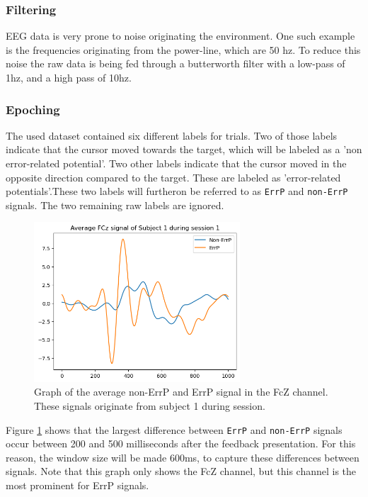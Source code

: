 \subsubsection{Filtering}

EEG data is very prone to noise originating the environment. One such example is the frequencies originating from the power-line, which are 50 hz. To reduce this noise the raw data is being fed through a butterworth filter with a low-pass of 1hz, and a high pass of 10hz.

\subsubsection{Epoching}

The used dataset contained six different labels for trials. Two of those labels indicate that the cursor moved towards the target, which will be labeled as a 'non error-related potential'. Two other labels indicate that the cursor moved in the opposite direction compared to the target. These are labeled as 'error-related potentials'.These two labels will furtheron be referred to as \verb|ErrP| and \verb|non-ErrP| signals. The two remaining raw labels are ignored.

\begin{figure}[!tbp]
    \centering
        \includegraphics[width=7.7cm]{img/FcZs1s1-1000ms.png}
    \caption{Graph of the average non-ErrP and ErrP signal in the FcZ channel. These signals originate from subject 1 during session.}
    \label{fig:FcZ}
\end{figure}

Figure \ref{fig:FcZ} shows that the largest difference between \verb|ErrP| and \verb|non-ErrP| signals occur between 200 and 500 milliseconds after the feedback presentation. For this reason, the window size will be made 600ms, to capture these differences between signals. Note that this graph only shows the FcZ channel, but this channel is the most prominent for ErrP signals.

